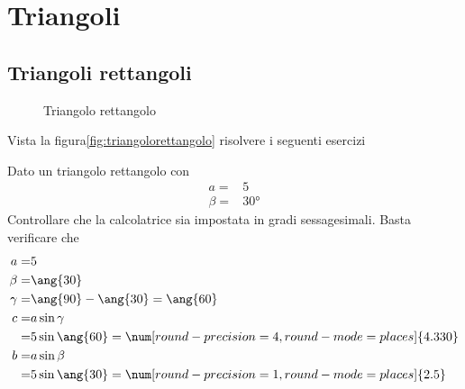 \tcbstartrecording
\chapter{Triangoli}
\label{cha:trigonometriatriangoli}
 \section{Triangoli rettangoli}
 
\begin{figure}
	\centering
	
	\caption{Triangolo rettangolo}
	\label{fig:triangolorettangolo}
\end{figure}

Vista la figura\nobs\vref{fig:triangolorettangolo} risolvere i seguenti esercizi
 \begin{exercise}
 	Dato un triangolo rettangolo con
 	\begin{align*}
 	a=&5\\
 	\beta=&\ang{30}
 	\end{align*}
\tcblower
Controllare che la calcolatrice sia impostata in gradi sessagesimali.
Basta verificare che \testgradi 
\begin{align*}
a=&5\\
\beta=&\ang{30}\\
\gamma=&\ang{90}-\ang{30}=\ang{60}\\
c=&a\sin\gamma\\
=& 5\sin\ang{60}=\num[round-precision=\lungarrotandamento,round-mode=places]{4.330}\\
b=&a\sin\beta\\
=& 5\sin\ang{30}=\num[round-precision=1,round-mode=places]{2.5}
\end{align*}
 \end{exercise}
 
